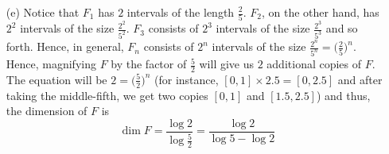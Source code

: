 \documentclass[11pt]{article}
\begin{document}
\begin{itemize}
\begin{itemize}
            \item[(e)]
                Notice that $F_1$ has $2$ intervals of the length
                $\frac{2}{5}$. $F_2$, on the other hand, has $2^2$ intervals of
                the size $\frac{2^2}{5^2}$. $F_3$ consists of $2^3$ intervals
                of the size $\frac{2^3}{5^3}$ and so forth. Hence, in general,
                $F_n$ consists of $2^n$ intervals of the size $\frac{2^n}{5^n}
                = \Big(\frac{2}{5}\Big)^n$. Hence, magnifying $F$ by the factor
                of $\frac{5}{2}$ will give us $2$ additional copies of $F$.
                The equation will be $2 = \Big(\frac{5}{2}\Big)^n$ (for
                instance, $[0 ,1] \times 2.5 = [0, 2.5]$ and after taking the
                middle-fifth, we get two copies $[0, 1]$ and $[1.5, 2.5]$) and
                thus, the dimension of $F$ is
                \begin{equation*}
                    \boxed{\dim{F} = \dfrac{\log{2}}{\log{\frac{5}{2}}} =
                    \dfrac{\log{2}}{\log{5} - \log{2}}}
                \end{equation*}
        \end{itemize}


\end{itemize}
\end{document}
